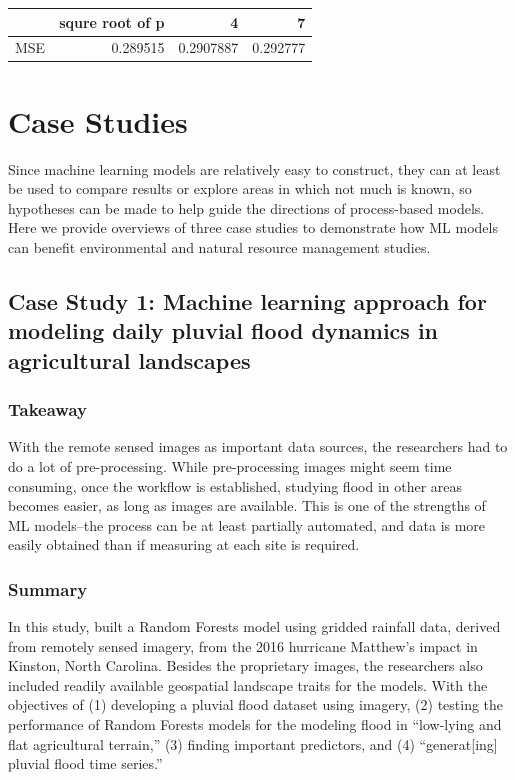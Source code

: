 \documentclass[
]{book}
\begin{document}
\begin{tabular}{l|r|r|r}
\hline
  & squre root of p & 4 & 7\\
\hline
MSE & 0.289515 & 0.2907887 & 0.292777\\
\hline
\end{tabular}

\hypertarget{case-studies}{%
\chapter{Case Studies}\label{case-studies}}

Since machine learning models are relatively easy to construct, they can at least be used to compare results or explore areas in which not much is known, so hypotheses can be made to help guide the directions of process-based models. Here we provide overviews of three case studies to demonstrate how ML models can benefit environmental and natural resource management studies.

\hypertarget{case-study-1-machine-learning-approach-for-modeling-daily-pluvial-flood-dynamics-in-agricultural-landscapes}{%
\section{Case Study 1: Machine learning approach for modeling daily pluvial flood dynamics in agricultural landscapes}\label{case-study-1-machine-learning-approach-for-modeling-daily-pluvial-flood-dynamics-in-agricultural-landscapes}}

\hypertarget{takeaway}{%
\subsection{Takeaway}\label{takeaway}}

With the remote sensed images as important data sources, the researchers had to do a lot of pre-processing. While pre-processing images might seem time consuming, once the workflow is established, studying flood in other areas becomes easier, as long as images are available. This is one of the strengths of ML models--the process can be at least partially automated, and data is more easily obtained than if measuring at each site is required.

\hypertarget{summary}{%
\subsection{Summary}\label{summary}}

In this study, \citet{fidan2023} built a Random Forests model using gridded rainfall data, derived from remotely sensed imagery, from the 2016 hurricane Matthew's impact in Kinston, North Carolina. Besides the proprietary images, the researchers also included readily available geospatial landscape traits for the models. With the objectives of (1) developing a pluvial flood dataset using imagery, (2) testing the performance of Random Forests models for the modeling flood in ``low-lying and flat agricultural terrain,'' (3) finding important predictors, and (4) ``generat{[}ing{]} pluvial flood time series.''
\end{document}
